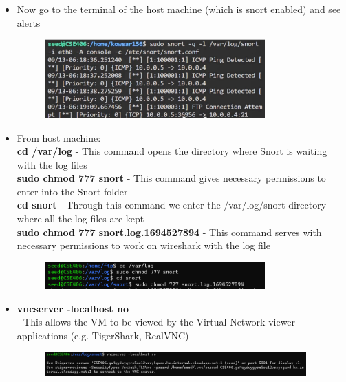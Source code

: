 \documentclass[12pt, A4Paper]{article}
\begin{document}
\begin{enumerate}
\begin{itemize}
        \item Now go to the terminal of the host machine (which is snort enabled) and see alerts\\
        \begin{figure}[h]
            \centering
            \includegraphics[width=0.8\textwidth]{images/log_alert_console}
        \end{figure}

        \item From host machine:\\
        \textbf{cd /var/log}
        - This command opens the directory where Snort is waiting with the log files\\
        \textbf{sudo chmod 777 snort}
        - This command gives necessary permissions to enter into the Snort folder\\
        \textbf{cd snort}
        - Through this command we enter the /var/log/snort directory where all the log files are kept\\
        \textbf{sudo chmod 777 snort.log.1694527894}
        - This command serves with necessary permissions to work on wireshark with the log file\\
        \begin{figure}[h]
            \centering
            \includegraphics[width=0.8\textwidth]{images/cd}
        \end{figure}

        \item \textbf{vncserver -localhost no}\\
        - This allows the VM to be viewed by the Virtual Network viewer applications (e.g. TigerShark, RealVNC)\\
        \begin{figure}[h]
            \centering
            \includegraphics[width=0.95\textwidth]{images/vnc}
        \end{figure}


\end{itemize}
\end{enumerate}
\end{document}
